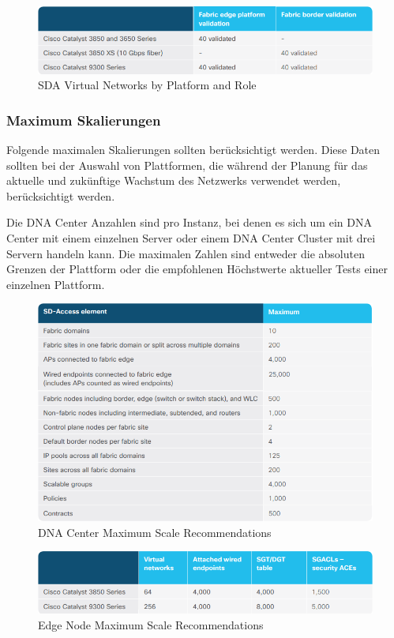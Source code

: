 \begin{figure}[H]
	\centering
	\includegraphics[width=0.8\linewidth]{img/Analyse/CVD-SDAvirtualnetworksbyplatformandrole-1-2-5}
	\caption{SDA Virtual Networks by Platform and Role \cite{sda-designguide-sept2018}}
	\label{fig:SDA virtual networks by platform and role}
\end{figure}


\subsubsection{Maximum Skalierungen}
Folgende maximalen Skalierungen sollten berücksichtigt werden. Diese Daten sollten bei der Auswahl von Plattformen, die während der Planung für das aktuelle und zukünftige Wachstum des Netzwerks verwendet werden, berücksichtigt werden.

Die DNA Center Anzahlen sind pro Instanz, bei denen es sich um ein DNA Center mit einem einzelnen Server oder einem DNA Center Cluster mit drei Servern handeln kann. Die maximalen Zahlen sind entweder die absoluten Grenzen der Plattform oder die empfohlenen Höchstwerte aktueller Tests einer einzelnen Plattform.

\begin{figure}[H]
	\centering
	\includegraphics[width=0.8\linewidth]{img/Analyse/CVD-MaxScale-DNAC-1-2-5}
	\caption{DNA Center Maximum Scale Recommendations \cite{sda-designguide-sept2018} }
	\label{fig:DNA Center Maximum Scale RecommendationsA}
\end{figure}

\begin{figure}[H]
	\centering
	\includegraphics[width=0.8\linewidth]{img/Analyse/CVD-MaxScale-EdgeNode-1-2-5}
	\caption{Edge Node Maximum Scale Recommendations \cite{sda-designguide-sept2018} }
	\label{fig:Edge Node Maximum Scale RecommendationsA}
\end{figure}

